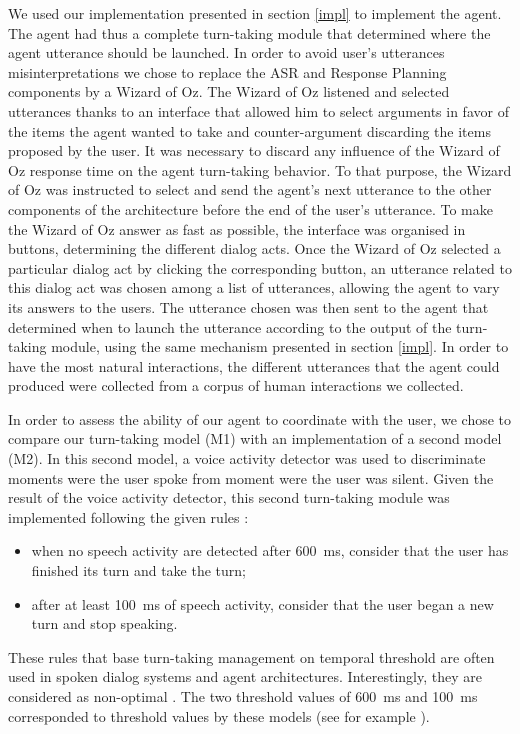 We used our implementation presented in section \ref{impl} to implement the agent. The agent had thus a complete turn-taking module that determined where the agent utterance should be launched. In order to avoid user's utterances misinterpretations we chose to replace the ASR and Response Planning components by a Wizard of Oz. The Wizard of Oz listened and selected utterances thanks to an interface that allowed him to select arguments in favor of the items the agent wanted to take and counter-argument discarding the items proposed by the user. It was necessary to discard any influence of the Wizard of Oz response time on the agent turn-taking behavior. To that purpose, the Wizard of Oz was instructed to select and send the agent's next utterance to the other components of the architecture before the end of the user's utterance. To make the Wizard of Oz answer as fast as possible, the interface was organised in buttons, determining the different dialog acts. Once the Wizard of Oz selected a particular dialog act by clicking the corresponding button, an utterance related to this dialog act was chosen among a list of utterances, allowing the agent to vary its answers to the users. The utterance chosen was then sent to the agent that determined when to launch the utterance according to the output of the turn-taking module, using the same mechanism presented in section \ref{impl}. In order to have the most natural interactions, the different utterances that the agent could produced were collected from a corpus of human interactions we collected. 


In order to assess the ability of our agent to coordinate with the user, we chose to compare our turn-taking model (M1) with an implementation of a second model (M2). 
In this second model, a voice activity detector was used to discriminate moments were the user spoke from moment were the user was silent. Given the result of the voice activity detector, this second turn-taking module was implemented following the given rules : \begin{itemize}
	\item when no speech activity are detected after 600~ms, consider that the user has finished its turn and take the turn;
	\item after at least 100~ms of speech activity, consider that the user began a new turn and stop speaking. 
\end{itemize} 
These rules that base turn-taking management on temporal threshold are often used in spoken dialog systems and agent architectures. Interestingly, they are considered as non-optimal \citep{ward_root_2005}. 
The two threshold values of 600~ms and 100~ms corresponded to threshold values by these models (see for example \citep{ferrer_is_2002}). 


